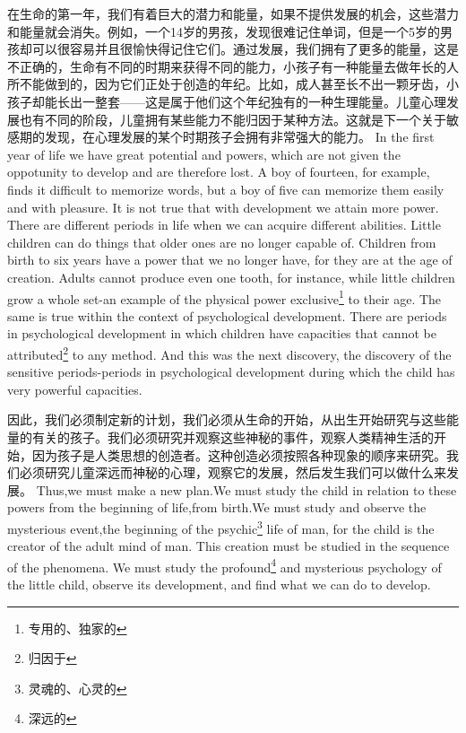 \documentclass[lang=cn,10pt]{elegantbook}
\begin{document}
\begin{tcolorbox}[title=译文,
colback=red!5!white,
colframe=red!75!black,
fonttitle=\bfseries]
在生命的第一年，我们有着巨大的潜力和能量，如果不提供发展的机会，这些潜力和能量就会消失。例如，一个14岁的男孩，发现很难记住单词，但是一个5岁的男孩却可以很容易并且很愉快得记住它们。通过发展，我们拥有了更多的能量，这是不正确的，生命有不同的时期来获得不同的能力，小孩子有一种能量去做年长的人所不能做到的，因为它们正处于创造的年纪。比如，成人甚至长不出一颗牙齿，小孩子却能长出一整套——这是属于他们这个年纪独有的一种生理能量。儿童心理发展也有不同的阶段，儿童拥有某些能力不能归因于某种方法。这就是下一个关于敏感期的发现，在心理发展的某个时期孩子会拥有非常强大的能力。
In the first year of life we have great potential and powers, which are not given the oppotunity to develop and are therefore lost. A boy of fourteen, for example, finds it difficult to memorize words, but a boy of five can memorize them easily and with pleasure. It is not true that with development we attain more power. There are different periods in life when we can acquire different abilities. Little children can do things that older ones are no longer capable of. Children from birth to six years have a power that we no longer have, for they are at the age of creation. Adults cannot produce even one tooth, for instance, while little children grow a whole set-an example of the physical power exclusive\footnote{专用的、独家的} to their age. The same is true within the context of psychological development. There are periods in psychological development in which children have capacities that cannot be attributed\footnote{归因于} to any method. And this was the next discovery, the discovery of the sensitive periods-periods in psychological development during which the child has very powerful capacities.
\end{tcolorbox}

\begin{tcolorbox}[title=译文,
colback=red!5!white,
colframe=red!75!black,
fonttitle=\bfseries]
因此，我们必须制定新的计划，我们必须从生命的开始，从出生开始研究与这些能量的有关的孩子。我们必须研究并观察这些神秘的事件，观察人类精神生活的开始，因为孩子是人类思想的创造者。这种创造必须按照各种现象的顺序来研究。我们必须研究儿童深远而神秘的心理，观察它的发展，然后发生我们可以做什么来发展。
Thus,we must make a new plan.We must study the child in relation to these powers from the beginning of life,from birth.We must study and observe the mysterious event,the beginning of the psychic\footnote{灵魂的、心灵的} life of man, for the child is the creator of the adult mind of man. This creation must be studied in the sequence of the phenomena. We must study the profound\footnote{深远的} and mysterious psychology of the little child, observe its development, and find what we can do to develop.
\end{tcolorbox}
\end{document}
